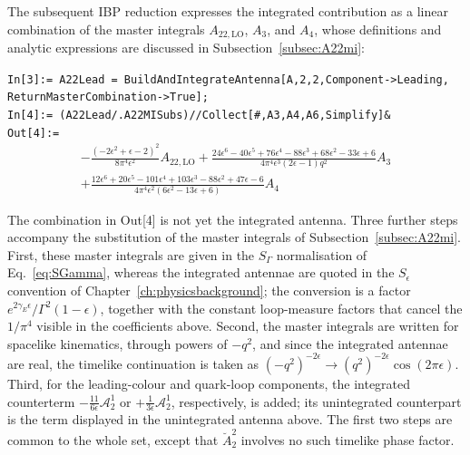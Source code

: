 The subsequent IBP reduction expresses the integrated contribution as a linear combination of the
master integrals $A_{22,\mathrm{LO}}$, $A_3$, and $A_4$, whose definitions and analytic expressions
are discussed in Subsection~\ref{subsec:A22mi}:

\begin{mdframed}[backgroundcolor=gray!10, linewidth=0pt]
\texttt{In[3]:= A22Lead = BuildAndIntegrateAntenna[A,2,2,Component->Leading,\\ReturnMasterCombination->True];}\\
\texttt{In[4]:= (A22Lead/.A22MISubs)//Collect[\#,{A3,A4,A6},Simplify]\&}\\
\hfill
\texttt{Out[4]:=}
    \begin{equation*}
        \begin{gathered}
            -\frac{\left(-2\epsilon^2+\epsilon-2\right)^2}{8\pi^4\epsilon^2}A_{22,\text{LO}}
            +\frac{24\epsilon^6-40\epsilon^5+76\epsilon^4-88\epsilon^3+68\epsilon^2-33\epsilon+6}{4\pi^4\epsilon^3(2\epsilon-1)q^2}A_3\\
            +\frac{12\epsilon^6+20\epsilon^5-101\epsilon^4+103\epsilon^3-88\epsilon^2+47\epsilon-6}{4\pi^4\epsilon^2\left(6\epsilon^2-13\epsilon+6\right)}A_4
        \end{gathered}
    \end{equation*}
\end{mdframed}

The combination in Out[4] is not yet the integrated antenna. Three further steps accompany the
substitution of the master integrals of Subsection~\ref{subsec:A22mi}. First, these master integrals
are given in the $S_\Gamma$ normalisation of Eq.~\eqref{eq:SGamma}, whereas the integrated antennae are
quoted in the $S_\epsilon$ convention of Chapter~\ref{ch:physicsbackground}; the conversion is a
factor $e^{2\gamma_E\epsilon}/\Gamma^2(1-\epsilon)$, together with the constant loop-measure factors
that cancel the $1/\pi^4$ visible in the coefficients above. Second, the master integrals are written
for spacelike kinematics, through powers of $-q^2$, and since the integrated antennae are real, the
timelike continuation is taken as $(-q^2)^{-2\epsilon}\to(q^2)^{-2\epsilon}\cos(2\pi\epsilon)$. Third,
for the leading-colour and quark-loop components, the integrated counterterm
$-\tfrac{11}{6\epsilon}\mathcal A_2^1$ or $+\tfrac{1}{3\epsilon}\mathcal A_2^1$, respectively, is
added; its unintegrated counterpart is the term displayed in the unintegrated antenna above. The
first two steps are common to the whole set, except that $\breve A_2^2$ involves no such timelike
phase factor.

